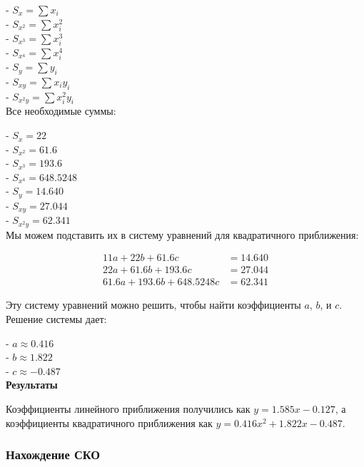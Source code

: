 \documentclass{article}
\begin{document}
            - \(S_x = \sum x_i\) \\
            - \(S_{x^2} = \sum x_i^2\) \\
            - \(S_{x^3} = \sum x_i^3\) \\
            - \(S_{x^4} = \sum x_i^4\) \\
            - \(S_y = \sum y_i\) \\ 
            - \(S_{xy} = \sum x_i y_i\) \\ 
            - \(S_{x^2y} = \sum x_i^2 y_i\) \\

            
            Все необходимые суммы:
            
            - \(S_x = 22\) \\
            - \(S_{x^2} = 61.6\) \\
            - \(S_{x^3} = 193.6\) \\
            - \(S_{x^4} = 648.5248\) \\
            - \(S_y = 14.640\) \\
            - \(S_{xy} = 27.044\) \\
            - \(S_{x^2y} = 62.341\) \\
            
            Мы можем подставить их в систему уравнений для квадратичного приближения:
            
            \[
            \begin{aligned}
            11a + 22b + 61.6c &= 14.640 \\
            22a + 61.6b + 193.6c &= 27.044 \\
            61.6a + 193.6b + 648.5248c &= 62.341
            \end{aligned}
            \]
            
            Эту систему уравнений можно решить, чтобы найти коэффициенты \(a\), \(b\), и \(c\). Решение системы дает:
            
            - \(a \approx 0.416\) \\ 
            - \(b \approx 1.822\) \\ 
            - \(c \approx -0.487\) 
            \\
            \textbf{Результаты}
            
            Коэффициенты линейного приближения получились как \(y = 1.585x - 0.127\), а коэффициенты квадратичного приближения как \(y = 0.416x^2 + 1.822x - 0.487\).

      \subsubsection{Нахождение СКО}
\end{document}
